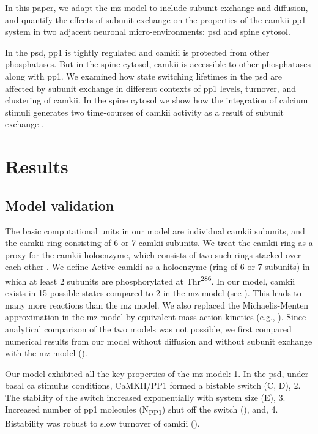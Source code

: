 \documentclass[9pt,lineno,doublespacing]{elife}
\newcommand\SUB[2]{#1\textsubscript{#2}}
\newcommand\SUP[2]{#1\textsuperscript{#2}}
\begin{document}
In this paper, we adapt the \gls{mz} model \citep{miller_stability_2005} to include
subunit exchange and diffusion, and quantify the effects of subunit exchange on
the properties of the \gls{camkii}-\gls{pp1} system in two adjacent neuronal
micro-environments: \gls{psd} and spine cytosol. 

In the \gls{psd}, \gls{pp1} is tightly regulated and \gls{camkii} is protected
from other phosphatases. But in the spine cytosol, \gls{camkii} is accessible to
other phosphatases along with \gls{pp1}. We examined how state switching
lifetimes in the \gls{psd} are affected by subunit exchange in different
contexts of \gls{pp1} levels, turnover, and clustering of \gls{camkii}. In the
spine cytosol we show how the integration of calcium stimuli generates two
time-courses of \gls{camkii} activity as a result of subunit exchange
\citep{chang_camkii_2017}.

\section{Results}\label{sec:results} 
\subsection{Model validation}\label{subsec:model-validation}
The basic computational units in our model are individual \gls{camkii} subunits,
and the \gls{camkii} ring consisting of 6 or 7 \gls{camkii} subunits. We treat
the \gls{camkii} ring as a proxy for the \gls{camkii} holoenzyme, which consists
of two such rings stacked over each other
\citep{woodgett_calmodulin-dependent_1983,hoelz_crystal_2003,chao_mechanism_2011}.
We define Active \gls{camkii} as a holoenzyme (ring of 6 or 7 subunits) in which
at least 2 subunits are phosphorylated at \SUP{Thr}{286}.  In our model,
\gls{camkii} exists in 15 possible states compared to 2 in the \gls{mz} model
(see ). This leads to many more reactions
than the \gls{mz} model. We also replaced the Michaelis-Menten approximation in
the \gls{mz} model by equivalent mass-action kinetics (e.g.,
).  Since analytical comparison of the two models was not
possible, we first compared numerical results from our model without diffusion
and without subunit exchange with the \gls{mz} model ().

Our model exhibited all the key properties of the \gls{mz} model: 1. In the
\gls{psd}, under basal \gls{ca} stimulus conditions, CaMKII/PP1 formed a
bistable switch (C, D), 2. The stability of the switch increased
exponentially with system size (E), 3. Increased number of
\gls{pp1} molecules (\SUB{N}{PP1}) shut off the switch (),
and, 4. Bistability was robust to slow turnover of \gls{camkii}
().
\end{document}
